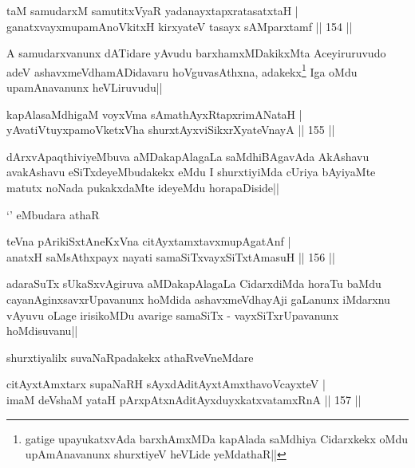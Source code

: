 \begin{shl}
taM samudarxM samutitxVyaR yadanayxtapxratasatxtaH |\\
ganatxvayxmupamAnoVkitxH kirxyateV tasayx sAMparxtamf \hfill || 154 ||
\end{shl}

\begin{artha}
A samudarxvanunx dATidare yAvudu barxhamxMDakikxMta Aceyiruruvudo adeV ashavxmeVdhamADidavaru hoVguvasAthxna, adakekx\footnote{gatige upayukatxvAda barxhAmxMDa  kapAlada saMdhiya Cidarxkekx oMdu upAmAnavanunx shurxtiyeV heVLide yeMdathaR||} Iga oMdu upamAnavanunx heVLiruvudu||
\end{artha}

\begin{shl}
kapAlasaMdhigaM voyxVma sAmathAyxRtapxrimANataH |\\
yAvatiVtuyxpamoVketxVha shurxtAyx\s \s viSikxrXyateV\s nayA \hfill || 155 ||
\end{shl}

\begin{artha}
dArxvApaqthiviyeMbuva aMDakapAlagaLa saMdhiBAgavAda AkAshavu avakAshavu eSiTxdeyeMbudakekx \stext eMdu I shurxtiyiMda cUriya bAyiyaMte matutx noNada pukakxdaMte ideyeMdu horapaDiside|| 
\end{artha}

\begin{artha}
`\stext' eMbudara athaR
\end{artha}

\begin{shl}
teVna pArikiSxtAneKxVna citAyxtamxtavxmupAgatAnf |\\
anatxH saMsAthxpayx nayati samaSiTxvayxSiTxtAmasuH \hfill || 156 ||
\end{shl}

\begin{artha}
adaraSuTx sUkaSxvAgiruva aMDakapAlagaLa CidarxdiMda horaTu baMdu cayanAginxsavxrUpavanunx hoMdida ashavxmeVdhayAji gaLanunx iMdarxnu vAyuvu oLage irisikoMDu avarige samaSiTx - vayxSiTxrUpavanunx hoMdisuvanu||
\end{artha}

\begin{artha}
shurxtiyalilx suvaNaRpadakekx athaRveVneMdare
\end{artha}

\begin{shl}
citAyxtAmx\s tarx supaNaRH sAyxdAditAyxtAmx\s thavoVcayxteV |\\
imaM deVshaM yataH pArxpAtxnAditAyxduyxkatxvatamxRnA \hfill || 157 ||
\end{shl}

